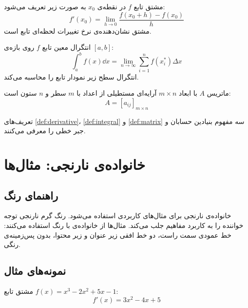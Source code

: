 \documentclass{matinbook}
\begin{document}
\begin{definition}
    مشتق تابع $f$ در نقطه‌ی $x_{0}$ به صورت زیر تعریف
    می‌شود:
    \[
        f'(x_{0}) = \lim_{h \to 0} \frac{f(x_{0} + h) - f(x_{0})}{h}
    \]
    مشتق نشان‌دهنده‌ی نرخ تغییرات لحظه‌ای تابع است.
    \label{def:derivative}
\end{definition}

\begin{definition}
    انتگرال معین تابع $f$ روی بازه‌ی $[a, b]$:
    \[
        \int_{a}^{b} f(x) \dd{x} = \lim_{n \to \infty}
        \sum_{i=1}^{n} f(x_{i}^{*}) \Delta x
    \]
    انتگرال سطح زیر نمودار تابع را محاسبه می‌کند.
    \label{def:integral}
\end{definition}

\begin{definition}[ماتریس]
    ماتریس $A$ با ابعاد $m \times n$ آرایه‌ای مستطیلی
    از اعداد با $m$ سطر و $n$ ستون است:
    \[
        A = [a_{ij}]_{m \times n}
    \]
    \label{def:matrix}
\end{definition}

تعریف‌های \cref{def:derivative}، \cref{def:integral} و
\cref{def:matrix} سه مفهوم بنیادین حسابان و جبر خطی را
معرفی می‌کنند.

\chapter{خانواده‌ی نارنجی: مثال‌ها}
\label{chap:family-orange}

\section{راهنمای رنگ}
\label{sec:family-orange-guide}

خانواده‌ی نارنجی برای مثال‌های کاربردی استفاده می‌شود.
رنگ گرم نارنجی توجه خواننده را به کاربرد مفاهیم جلب
می‌کند. مثال‌ها از خانواده‌ی  با رنگ
 استفاده می‌کنند: خط عمودی
سمت راست، دو خط افقی زیر عنوان و زیر محتوا، بدون
پس‌زمینه‌ی رنگی.

\section{نمونه‌های مثال}
\label{sec:family-orange-samples}

\begin{example}
    مشتق تابع $f(x) = x^{3} - 2x^{2} + 5x - 1$:
    \[
        f'(x) = 3x^{2} - 4x + 5
    \]
    \label{ex:derivative-poly}
\end{example}
\end{document}
